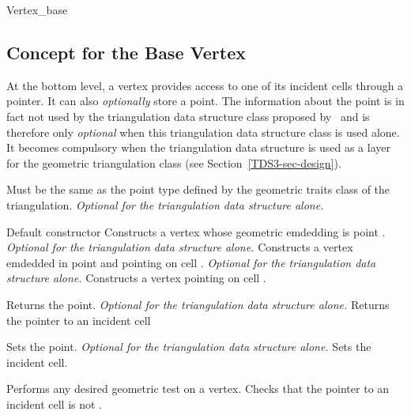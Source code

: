 	\begin{ccClass}{Vertex_base}
	\subsection{Concept for the Base Vertex}


At the bottom level, a vertex provides access to
one of its incident cells through a  pointer. 
It can also \textit{optionally} store a point. The
information about the point is in fact not used by the triangulation
data structure class proposed by \cgal\ and is therefore only
\textit{optional} when this triangulation data structure class is used
alone. It becomes compulsory when the 
triangulation data structure is used as a layer for the geometric
triangulation class (see Section~\ref{TDS3-sec-design}).

\ccTypes
{}
{Must be the same as the point type  defined by the
geometric traits class of the triangulation. {\textit{Optional for the
triangulation data structure alone.}}} 

\ccCreation

\ccConstructor{\ccClassName();}
{Default constructor}
\ccGlue
{}
{Constructs a vertex whose geometric emdedding is point
. {\textit{Optional for the triangulation data structure
alone.}}} 
\ccGlue
{}
{Constructs a vertex emdedded in point  and pointing on cell
. {\textit{Optional for the triangulation data structure alone.}}}
\ccGlue
{}
{Constructs a vertex pointing on cell .}

\ccAccessFunctions

{Returns the point. {\textit{Optional for the triangulation data
structure alone.}}} 
\ccGlue
{}
{Returns the pointer to an incident cell}


{Sets the point. {\textit{Optional for the triangulation data
structure alone.}}} 
\ccGlue
{}
{Sets the incident cell.}

{Performs any desired geometric test on a vertex. Checks that the
pointer to an incident cell is not .}


\end{ccClass}
